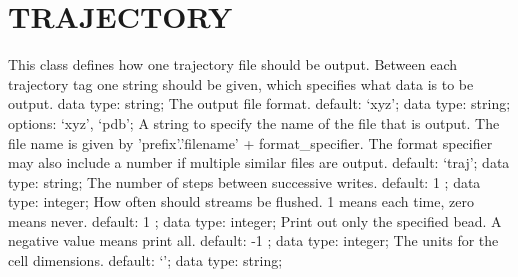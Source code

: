 \section{TRAJECTORY}
\label{TRAJECTORY}
\begin{ipifield}{}%
{This class defines how one trajectory file should be output. Between each trajectory tag one string should be given, which specifies what data is to be output.}%
{data type: string; }%
{%
{The output file format.}%
{default: `xyz'; data type: string; options: `xyz', `pdb'; }%
%
{A string to specify the name of the file that is output. The file name is given by 'prefix'.'filename' + format\_specifier. The format specifier may also include a number if multiple similar files are output.}%
{default: `traj'; data type: string; }%
%
{The number of steps between successive writes.}%
{default:  1 ; data type: integer; }%
%
{How often should streams be flushed. 1 means each time, zero means never.}%
{default:  1 ; data type: integer; }%
%
{Print out only the specified bead. A negative value means print all.}%
{default:  -1 ; data type: integer; }%
%
{The units for the cell dimensions.}%
{default: `'; data type: string; }%
}
\end{ipifield}
